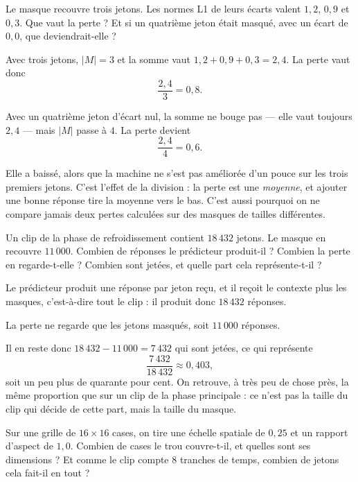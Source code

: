 \begin{exercice}
Le masque recouvre trois jetons. Les normes L1 de leurs écarts valent
$1{,}2$, $0{,}9$ et $0{,}3$. Que vaut la perte ? Et si un quatrième jeton
était masqué, avec un écart de $0{,}0$, que deviendrait-elle ?
\end{exercice}

\begin{solution}
Avec trois jetons, $|M| = 3$ et la somme vaut $1{,}2 + 0{,}9 + 0{,}3 =
2{,}4$. La perte vaut donc
\[
  \frac{2{,}4}{3} = 0{,}8 .
\]

Avec un quatrième jeton d'écart nul, la somme ne bouge pas — elle vaut
toujours $2{,}4$ — mais $|M|$ passe à $4$. La perte devient
\[
  \frac{2{,}4}{4} = 0{,}6 .
\]

Elle a baissé, alors que la machine ne s'est pas améliorée d'un pouce sur
les trois premiers jetons. C'est l'effet de la division : la perte est une
\emph{moyenne}, et ajouter une bonne réponse tire la moyenne vers le bas.
C'est aussi pourquoi on ne compare jamais deux pertes calculées sur des
masques de tailles différentes.
\end{solution}

\begin{exercice}
Un clip de la phase de refroidissement contient $18\,432$ jetons. Le masque
en recouvre $11\,000$. Combien de réponses le prédicteur produit-il ?
Combien la perte en regarde-t-elle ? Combien sont jetées, et quelle part
cela représente-t-il ?
\end{exercice}

\begin{solution}
Le prédicteur produit une réponse par jeton reçu, et il reçoit le contexte
plus les masques, c'est-à-dire tout le clip : il produit donc $18\,432$
réponses.

La perte ne regarde que les jetons masqués, soit $11\,000$ réponses.

Il en reste donc $18\,432 - 11\,000 = 7\,432$ qui sont jetées, ce qui
représente
\[
  \frac{7\,432}{18\,432} \approx 0{,}403 ,
\]
soit un peu plus de quarante pour cent. On retrouve, à très peu de chose
près, la même proportion que sur un clip de la phase principale : ce n'est
pas la taille du clip qui décide de cette part, mais la taille du masque.
\end{solution}

\begin{exercice}
Sur une grille de $16 \times 16$ cases, on tire une échelle spatiale de
$0{,}25$ et un rapport d'aspect de $1{,}0$. Combien de cases le trou
couvre-t-il, et quelles sont ses dimensions ? Et comme le clip compte $8$
tranches de temps, combien de jetons cela fait-il en tout ?
\end{exercice}

